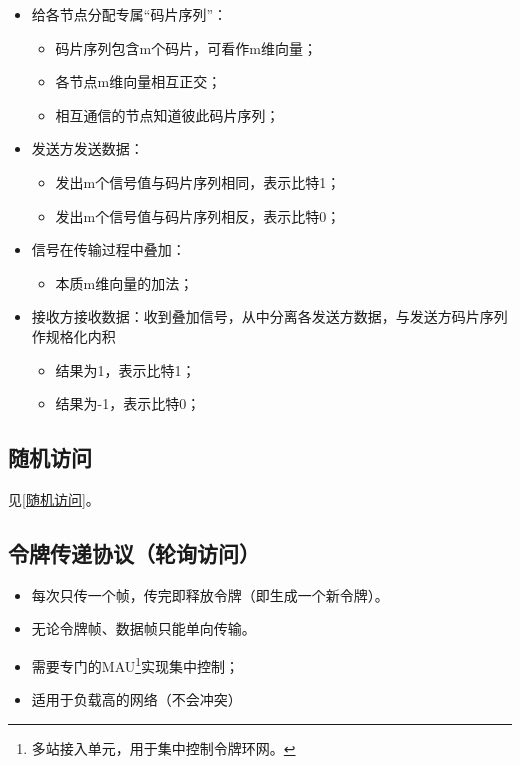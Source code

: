 \begin{itemize}
    \item 给各节点分配专属“码片序列”：\begin{itemize}
        \item 码片序列包含m个码片，可看作m维向量；
        \item 各节点m维向量相互正交；
        \item 相互通信的节点知道彼此码片序列；
    \end{itemize}
    \item 发送方发送数据：\begin{itemize}
        \item 发出m个信号值与码片序列相同，表示比特1；
        \item 发出m个信号值与码片序列相反，表示比特0；
    \end{itemize}
    \item 信号在传输过程中叠加：\begin{itemize}
        \item 本质m维向量的加法；
    \end{itemize}
    \item 接收方接收数据：收到叠加信号，从中分离各发送方数据，与发送方码片序列作规格化内积\begin{itemize}
        \item 结果为1，表示比特1；
        \item 结果为-1，表示比特0；
    \end{itemize}
\end{itemize}


\subsection{随机访问}
见\ref{随机访问}。


\subsection{令牌传递协议（轮询访问）}
\begin{itemize}
    \item 每次只传一个帧，传完即释放令牌（即生成一个新令牌）。
    \item 无论令牌帧、数据帧只能单向传输。
    \item 需要专门的MAU\footnote{多站接入单元，用于集中控制令牌环网。}实现集中控制；
    \item 适用于负载高的网络（不会冲突）
\end{itemize}


